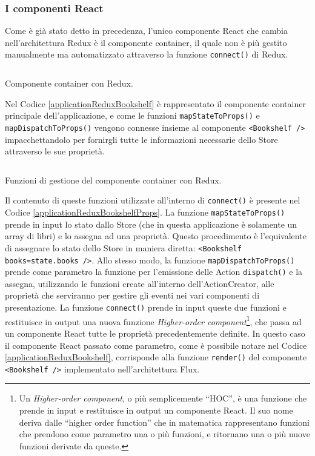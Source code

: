\subsubsection*{I componenti React}
Come è già stato detto in precedenza, l'unico componente React che cambia nell'architettura Redux è il componente container, il quale non è più gestito manualmente ma automatizzato attraverso la funzione \texttt{connect()} di Redux.

\begin{listing}[ht]
\inputminted{javascript}{sources/applicationReduxBookshelf.js}
\caption{Componente container con Redux.} 
\label{applicationReduxBookshelf} 
\end{listing}

Nel Codice \ref{applicationReduxBookshelf} è rappresentato il componente container principale dell'applicazione, e come le funzioni \texttt{mapStateToProps()} e \texttt{mapDispatchToProps()} vengono connesse insieme al componente \texttt{<Bookshelf />} impacchettandolo per fornirgli tutte le informazioni necessarie dello Store attraverso le sue proprietà.

\begin{listing}[ht]
\inputminted{javascript}{sources/applicationReduxBookshelfProps.js}
\caption{Funzioni di gestione del componente container con Redux.} 
\label{applicationReduxBookshelfProps} 
\end{listing} 

Il contenuto di queste funzioni utilizzate all'interno di \texttt{connect()} è presente nel Codice \ref{applicationReduxBookshelfProps}. La funzione \texttt{mapStateToProps()} prende in input lo stato dallo Store (che in questa applicazione è solamente un array di libri) e lo assegna ad una proprietà. Questo procedimento è l'equivalente di assegnare lo stato dello Store in maniera diretta: \texttt{<Bookshelf books={state.books} />}.
Allo stesso modo, la funzione \texttt{mapDispatchToProps()} prende come parametro la funzione per l'emissione delle Action \texttt{dispatch()} e la assegna, utilizzando le funzioni create all'interno dell'ActionCreator, alle proprietà che serviranno per gestire gli eventi nei vari componenti di presentazione.
La funzione \texttt{connect()} prende in input queste due funzioni e restituisce in output una nuova funzione \textit{Higher-order component}\footnote{Un \textit{Higher-order component}, o più semplicemente “HOC”, è una funzione che prende in input e restituisce in output un componente React. Il suo nome deriva dalle “higher order function” che in matematica rappresentano funzioni che prendono come parametro una o più funzioni, e ritornano una o più nuove funzioni derivate da queste.}, che passa ad un componente React tutte le proprietà precedentemente definite. In questo caso il componente React passato come parametro, come è possibile notare nel Codice \ref{applicationReduxBookshelf}, corrisponde alla funzione \texttt{render()} del componente \texttt{<Bookshelf />} implementato nell'architettura Flux.

